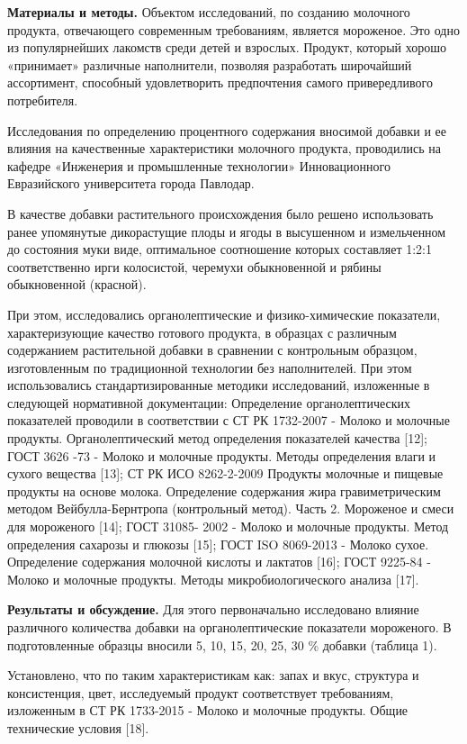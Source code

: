 \begin{multicols}{2}
{\bfseries Материалы и методы.} Объектом исследований, по созданию
молочного продукта, отвечающего современным требованиям, является
мороженое. Это одно из популярнейших лакомств среди детей и взрослых.
Продукт, который хорошо «принимает» различные наполнители, позволяя
разработать широчайший ассортимент, способный удовлетворить предпочтения
самого привередливого потребителя.

Исследования по определению процентного содержания вносимой добавки и ее
влияния на качественные характеристики молочного продукта, проводились
на кафедре «Инженерия и промышленные технологии» Инновационного
Евразийского университета города Павлодар.

В качестве добавки растительного происхождения было решено использовать
ранее упомянутые дикорастущие плоды и ягоды в высушенном и измельченном
до состояния муки виде, оптимальное соотношение которых составляет 1:2:1
соответственно ирги колосистой, черемухи обыкновенной и рябины
обыкновенной (красной).

При этом, исследовались органолептические и физико-химические
показатели, характеризующие качество готового продукта, в образцах с
различным содержанием растительной добавки в сравнении с контрольным
образцом, изготовленным по традиционной технологии без наполнителей. При
этом использовались стандартизированные методики исследований,
изложенные в следующей нормативной документации: Определение
органолептических показателей проводили в соответствии с СТ РК 1732-2007
- Молоко и молочные продукты. Органолептический метод определения
показателей качества {[}12{]}; ГОСТ 3626 -73 - Молоко и молочные
продукты. Методы определения влаги и сухого вещества {[}13{]}; СТ РК ИСО
8262-2-2009 Продукты молочные и пищевые продукты на основе молока.
Определение содержания жира гравиметрическим методом Вейбулла-Бернтропа
(контрольный метод). Часть 2. Мороженое и смеси для мороженого {[}14{]};
ГОСТ 31085- 2002 - Молоко и молочные продукты. Метод определения
сахарозы и глюкозы {[}15{]}; ГОСТ ISO 8069-2013 - Молоко сухое.
Определение содержания молочной кислоты и лактатов {[}16{]}; ГОСТ
9225-84 - Молоко и молочные продукты. Методы микробиологического анализа
{[}17{]}.

{\bfseries Результаты и обсуждение.} Для этого первоначально исследовано
влияние различного количества добавки на органолептические показатели
мороженого. В подготовленные образцы вносили 5, 10, 15, 20, 25, 30 \%
добавки (таблица 1).

Установлено, что по таким характеристикам как: запах и вкус, структура и
консистенция, цвет, исследуемый продукт соответствует требованиям,
изложенным в СТ РК 1733-2015 - Молоко и молочные продукты. Общие
технические условия {[}18{]}.


\end{multicols}
